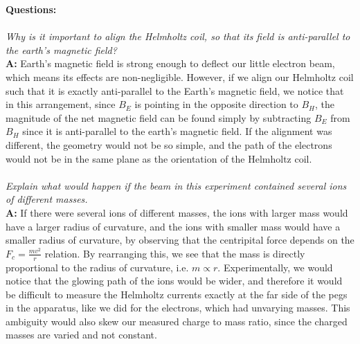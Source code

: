 \documentclass[letterpaper]{article}
\begin{document}
\textbf{Questions: }\\ \\
\textit{Why is it important to align the Helmholtz coil, so that its field is
        anti-parallel to the earth's magnetic field?}\\
\textbf{A:}
Earth's magnetic field is strong enough to deflect our little electron beam, which means its effects are non-negligible.
However, if we align our Helmholtz coil such that it is exactly anti-parallel to the Earth's magnetic field, we notice that
in this arrangement, since $B_E$ is pointing in the opposite direction to $B_H$, the magnitude of the net magnetic
field can be found simply by subtracting $B_E$ from $B_H$ since
it is anti-parallel to the earth's magnetic field. If the alignment was different, the geometry would not be so simple, and
the path of the electrons would not be in the same plane as the orientation of the Helmholtz coil.\\ \\
\textit{Explain what would happen if the beam in this experiment contained several ions of different masses.}\\
\textbf{A:}
If there were several ions of different masses, the ions with larger mass would
have a larger radius of curvature, and the ions with smaller mass would have a smaller radius of curvature, by observing that
the centripital force depends on the  $F_c=\frac{mv^2}{r}$ relation. By rearranging this, we see that
the mass is directly proportional to the radius of curvature, i.e. $m\propto r$.
Experimentally, we would notice that the glowing path of the ions would be wider, and therefore it would be difficult to measure
the Helmholtz currents exactly at the far side of the pegs in the apparatus, like we did for the electrons, which had unvarying masses.
This ambiguity would also skew our measured charge to mass ratio, since the charged masses are varied and not constant.
\end{document}
